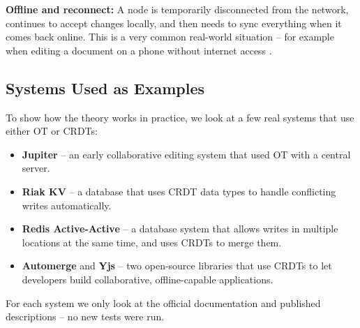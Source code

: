 \textbf{Offline and reconnect:} A node is temporarily disconnected from the network, continues to accept
changes locally, and then needs to sync everything when it comes back online. This is a very common
real-world situation -- for example when editing a document on a phone without internet access
\cite{automerge2024, nicolaescu2015}.

\subsection{Systems Used as Examples}

To show how the theory works in practice, we look at a few real systems that use either OT or CRDTs:

\begin{itemize}
    \item \textbf{Jupiter} \cite{nichols1995jupiter} -- an early collaborative editing system that used OT
    with a central server.
    \item \textbf{Riak KV} \cite{riak2024} -- a database that uses CRDT data types to handle conflicting
    writes automatically.
    \item \textbf{Redis Active-Active} \cite{redis2024} -- a database system that allows writes in multiple
    locations at the same time, and uses CRDTs to merge them.
    \item \textbf{Automerge} \cite{automerge2024} and \textbf{Yjs} \cite{nicolaescu2015} -- two
    open-source libraries that use CRDTs to let developers build collaborative, offline-capable
    applications.
\end{itemize}

For each system we only look at the official documentation and published descriptions -- no new tests
were run.
